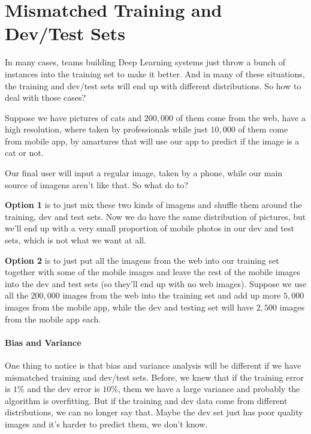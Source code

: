 \documentclass[12pt, a4paper, oneside]{book}
\begin{document}
\section{Mismatched Training and Dev/Test Sets}%
\label{sec:mismatched_training_and_dev_test_sets}

In many cases, teams building Deep Learning systems just throw a bunch of
instances into the training set to make it better. And in many of these
situations, the training and dev/test sets will end up with different
distributions. So how to deal with those cases?

Suppose we have pictures of cats and $200,000$ of them come from the web, have a
high resolution, where taken by professionals while just $10,000$ of them come
from mobile app, by amartures that will use our app to predict if the image is a
cat or not.

Our final user will input a regular image, taken by a phone, while our main
source of imagens aren't like that. So what do to?

\textbf{Option 1} is to just mix these two kinds of imagens and shuffle them
around the training, dev and test sets. Now we do have the same distribution of
pictures, but we'll end up with a very small proportion of mobile photos in our
dev and test sets, which is not what we want at all.

\textbf{Option 2} is to just put all the imagens from the web into our training
set together with some of the mobile images and leave the rest of the mobile
images into the dev and test sets (so they'll end up with no web images).
Suppose we use all the $200,000$ images from the web into the training set and
add up more $5,000$ images from the mobile app, while the dev and testing set
will have $2,500$ images from the mobile app each.

\paragraph{Bias and Variance}%
\label{par:bias_and_variance}

One thing to notice is that bias and variance analysis will be different if we
have mismatched training and dev/test sets. Before, we knew that if the training
error is $1\%$ and the dev error is $10\%$, them we have a large variance and
probably the algorithm is overfitting. But if the training and dev data come
from different distributions, we can no longer say that. Maybe the dev set just
has poor quality images and it's harder to predict them, we don't know.
\end{document}
